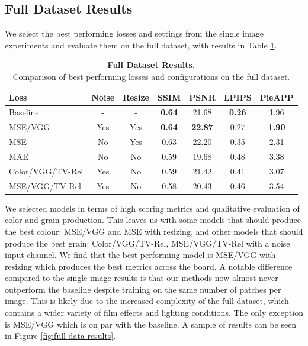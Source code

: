 \subsection{Full Dataset Results}

We select the best performing losses and settings from the single image experiments and evaluate them on the full dataset, with results in Table \ref{tab:full-data-results}.

\begin{table}
    \centering
    \captionsetup{justification=centering}
    \caption{\textbf{Full Dataset Results.} \\ Comparison of best performing losses and configurations on the full dataset.}
    \setlength{\tabcolsep}{0.3em}
    \begin{tabular}{lcccccc}
        \toprule
        Loss & Noise & Resize & SSIM & PSNR & LPIPS & PieAPP \\
        \midrule
        Baseline & - & - & \textbf{0.64} & 21.68 & \textbf{0.26} & 1.96 \\
        MSE/VGG & Yes & Yes & \textbf{0.64} & \textbf{22.87} & 0.27 & \textbf{1.90} \\
        MSE & No & Yes & 0.63 & 22.20 & 0.35 & 2.31 \\
        MAE & No & No & 0.59 & 19.68 & 0.48 & 3.38 \\
        Color/VGG/TV-Rel & Yes & No & 0.59 & 21.42 & 0.41 & 3.07 \\
        MSE/VGG/TV-Rel & Yes & No & 0.58 & 20.43 & 0.46 & 3.54 \\
        \bottomrule
    \end{tabular}
    \label{tab:full-data-results}
\end{table}

We selected models in terms of high scoring metrics and qualitative evaluation of color and grain production. This leaves us with some models that should produce the best colour: MSE/VGG and MSE with resizing, and other models that should produce the best grain: Color/VGG/TV-Rel, MSE/VGG/TV-Rel with a noise input channel. We find that the best performing model is MSE/VGG with resizing which produces the best metrics across the board. A notable difference compared to the single image results is that our methods now almost never outperform the baseline despite training on the same number of patches per image. This is likely due to the increased complexity of the full dataset, which contains a wider variety of film effects and lighting conditions. The only exception is MSE/VGG which is on par with the baseline. A sample of results can be seen in Figure \ref{fig:full-data-results}.


